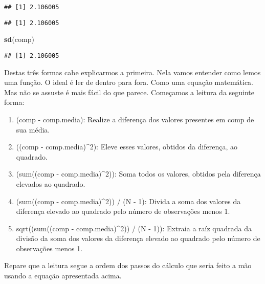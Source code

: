 \documentclass[]{book}
\newenvironment{Shaded}{\begin{snugshade}}{\end{snugshade}}
\newcommand{\KeywordTok}[1]{\textcolor[rgb]{0.13,0.29,0.53}{\textbf{#1}}}
\newcommand{\NormalTok}[1]{#1}
\newcommand{\OperatorTok}[1]{\textcolor[rgb]{0.81,0.36,0.00}{\textbf{#1}}}
\providecommand{\tightlist}{%
  \setlength{\itemsep}{0pt}\setlength{\parskip}{0pt}}
\begin{document}
\begin{verbatim}
## [1] 2.106005
\end{verbatim}

\begin{Shaded}
\end{Shaded}

\begin{verbatim}
## [1] 2.106005
\end{verbatim}

\begin{Shaded}
\begin{Highlighting}[]
\KeywordTok{sd}\NormalTok{(comp)}
\end{Highlighting}
\end{Shaded}

\begin{verbatim}
## [1] 2.106005
\end{verbatim}

Destas três formas cabe explicarmos a primeira. Nela vamos entender como lemos uma função. O ideal é ler de dentro para fora. Como uma equação matemática. Mas não se assuste é mais fácil do que parece. Começamos a leitura da seguinte forma:

\begin{enumerate}
\def\labelenumi{\arabic{enumi}.}
\tightlist
\item
  (comp - comp.media): Realize a diferença dos valores presentes em comp de sua média.
\item
  ((comp - comp.media)\^{}2): Eleve esses valores, obtidos da diferença, ao quadrado.
\item
  (sum((comp - comp.media)\^{}2)): Soma todos os valores, obtidos pela diferença elevados ao quadrado.
\item
  (sum((comp - comp.media)\^{}2)) / (N - 1): Divida a soma dos valores da diferença elevado ao quadrado pelo número de observações menos 1.
\item
  sqrt((sum((comp - comp.media)\^{}2)) / (N - 1)): Extraia a raíz quadrada da divisão da soma dos valores da diferença elevado ao quadrado pelo número de observações menos 1.
\end{enumerate}

Repare que a leitura segue a ordem dos passos do cálculo que seria feito a mão usando a equação apresentada acima.
\end{document}
